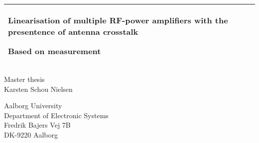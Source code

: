%
%
%
%
%
\begin{titlepage}
  \addtolength{\hoffset}{0.5\evensidemargin-0.5\oddsidemargin} %
  \noindent%
  \begin{tabular}{@{}p{\textwidth}@{}}
    \toprule[2pt]
    \midrule
    \vspace{0.2cm}
    \begin{center}
    \Huge{\textbf{
      Linearisation of multiple RF-power amplifiers with the presentence of antenna crosstalk %
    }}
    \end{center}
    \begin{center}
      \Large{
         Based on measurement %
      }
    \end{center}
    \vspace{0.2cm}\\
    \midrule
    \toprule[2pt]
  \end{tabular}
  \vspace{4 cm}
  \begin{center}
    {\large
      Master thesis%
    }\\
    \vspace{0.2cm}
    {\Large
      Karsten Schou Nielsen%
    }
  \end{center}
  \vfill
  \begin{center}
  Aalborg University\\
  Department of Electronic Systems\\
  Fredrik Bajers Vej 7B\\
  DK-9220 Aalborg
  \end{center}
\end{titlepage}
\clearpage
